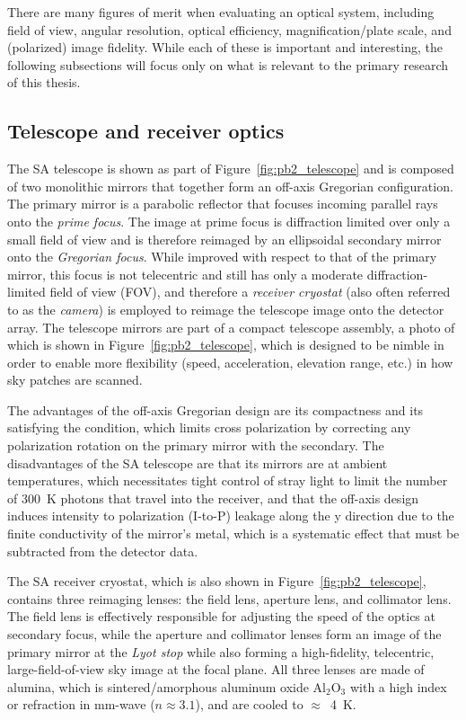 There are many figures of merit when evaluating an optical system, including field of view,  angular resolution, optical efficiency, magnification/plate scale, and (polarized) image fidelity. While each of these is important and interesting, the following subsections will focus only on what is relevant to the primary research of this thesis. 


\subsection{Telescope and receiver optics}
\label{sec:telescope_optics}

The SA telescope is shown as part of Figure~\ref{fig:pb2_telescope} and is composed of two monolithic mirrors that together form an off-axis Gregorian configuration. The primary mirror is a parabolic reflector that focuses incoming parallel rays onto the \textit{prime focus}. The image at prime focus is diffraction limited over only a small field of view and is therefore reimaged by an ellipsoidal secondary mirror onto the \textit{Gregorian focus}. While improved with respect to that of the primary mirror, this focus is not telecentric and still has only a moderate diffraction-limited field of view (FOV), and therefore a \textit{receiver cryostat} (also often referred to as the \textit{camera}) is employed to reimage the telescope image onto the detector array. The telescope mirrors are part of a compact telescope assembly, a photo of which is shown in Figure~\ref{fig:pb2_telescope}, which is designed to be nimble in order to enable more flexibility (speed, acceleration, elevation range, etc.) in how sky patches are scanned.

The advantages of the off-axis Gregorian design are its compactness and its satisfying the  condition, which limits cross polarization by correcting any polarization rotation on the primary mirror with the secondary. The disadvantages of the SA telescope are that its mirrors are at ambient temperatures, which necessitates tight control of stray light to limit the number of 300~K photons that travel into the receiver, and that the off-axis design induces intensity to polarization (I-to-P) leakage along the y direction due to the finite conductivity of the mirror's metal, which is a systematic effect that must be subtracted from the detector data.

The SA receiver cryostat, which is also shown in Figure~\ref{fig:pb2_telescope}, contains three reimaging lenses: the field lens, aperture lens, and collimator lens. The field lens is effectively responsible for adjusting the speed of the optics at secondary focus, while the aperture and collimator lenses form an image of the primary mirror at the \textit{Lyot stop} while also forming a high-fidelity, telecentric, large-field-of-view sky image at the focal plane. All three lenses are made of alumina, which is sintered/amorphous aluminum oxide $\mathrm{Al_{2}O_{3}}$ with a high index or refraction in mm-wave ($n \approx 3.1$), and are cooled to $\approx$~4~K.

